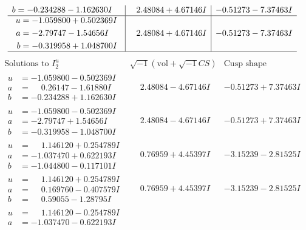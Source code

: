 \documentclass[1p]{elsarticle_modified}
\theoremstyle{definition}
\newcommand{\I}{\sqrt{-1}}
\begin{document}
$$\begin{array}{c|c|c}
\begin{aligned}
b &= -0.234288 - 1.162630 I\end{aligned}
 & \phantom{-}2.48084 + 4.67146 I & -0.51273 - 7.37463 I \\ \hline\begin{aligned}
u &= -1.059800 + 0.502369 I \\
a &= -2.79747 - 1.54656 I \\
b &= -0.319958 + 1.048700 I\end{aligned}
 & \phantom{-}2.48084 + 4.67146 I & -0.51273 - 7.37463 I\\
 \hline 
 \end{array}$$\newpage$$\begin{array}{c|c|c}  
\text{Solutions to }I^u_{2}& \I (\text{vol} + \sqrt{-1}CS) & \text{Cusp shape}\\
 \hline 
\begin{aligned}
u &= -1.059800 - 0.502369 I \\
a &= \phantom{-}0.26147 - 1.61880 I \\
b &= -0.234288 + 1.162630 I\end{aligned}
 & \phantom{-}2.48084 - 4.67146 I & -0.51273 + 7.37463 I \\ \hline\begin{aligned}
u &= -1.059800 - 0.502369 I \\
a &= -2.79747 + 1.54656 I \\
b &= -0.319958 - 1.048700 I\end{aligned}
 & \phantom{-}2.48084 - 4.67146 I & -0.51273 + 7.37463 I \\ \hline\begin{aligned}
u &= \phantom{-}1.146120 + 0.254789 I \\
a &= -1.037470 + 0.622193 I \\
b &= -1.044800 - 0.117101 I\end{aligned}
 & \phantom{-}0.76959 + 4.45397 I & -3.15239 - 2.81525 I \\ \hline\begin{aligned}
u &= \phantom{-}1.146120 + 0.254789 I \\
a &= \phantom{-}0.169760 - 0.407579 I \\
b &= \phantom{-}0.59055 - 1.28795 I\end{aligned}
 & \phantom{-}0.76959 + 4.45397 I & -3.15239 - 2.81525 I \\ \hline\begin{aligned}
u &= \phantom{-}1.146120 - 0.254789 I \\
a &= -1.037470 - 0.622193 I \\

\end{aligned}
\end{array}$$
\end{document}
